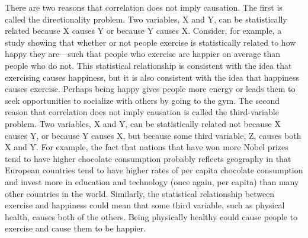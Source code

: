  There are two reasons that correlation does not imply causation. The first is called the directionality problem. Two variables, X and Y, can be statistically related because X causes Y or because Y causes X. Consider, for example, a study showing that whether or not people exercise is statistically related to how happy they are---such that people who exercise are happier on average than people who do not. This statistical relationship is consistent with the idea that exercising causes happiness, but it is also consistent with the idea that happiness causes exercise. Perhaps being happy gives people more energy or leads them to seek opportunities to socialize with others by going to the gym. The second reason that correlation does not imply causation is called the third-variable problem. Two variables, X and Y, can be statistically related not because X causes Y, or because Y causes X, but because some third variable, Z, causes both X and Y. For example, the fact that nations that have won more Nobel prizes tend to have higher chocolate consumption probably reflects geography in that European countries tend to have higher rates of per capita chocolate consumption and invest more in education and technology (once again, per capita) than many other countries in the world. Similarly, the statistical relationship between exercise and happiness could mean that some third variable, such as physical health, causes both of the others. Being physically healthy could cause people to exercise and cause them to be happier.


